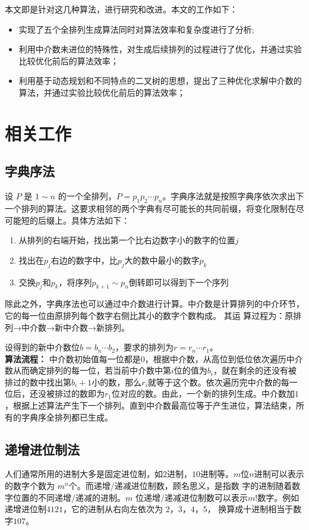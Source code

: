 \documentclass[10pt, twocolumn]{ctexart}
\begin{document}
本文即是针对这几种算法，进行研究和改进。本文的工作如下：\\
\begin{itemize}
  \item 实现了五个全排列生成算法同时对算法效率和复杂度进行了分析;
  \item 利用中介数未进位的特殊性，对生成后续排列的过程进行了优化，并通过实验比较优化前后的算法效率；
  \item 利用基于动态规划和不同特点的二叉树的思想，提出了三种优化求解中介数的算法，并通过实验比较优化前后的算法效率； 
\end{itemize}
\section{相关工作}
\subsection{字典序法}
设 $P$ 是 $1\sim n$ 的一个全排列，$P=p_1p_2\cdots p_n$。字典序法就是按照字典序依次求出下一个排列的算法。这要求相邻的两个字典有尽可能长的共同前缀，将变化限制在尽可能短的后缀上。具体方法如下：
\begin{enumerate}
  \item 从排列的右端开始，找出第一个比右边数字小的数字的位置$j$
  \item 找出在$p_j$右边的数字中，比$p_j$大的数中最小的数字$p_k$
  \item 交换$p_j$和$p_k$，将序列$p_{k+1}\sim p_{n}$倒转即可以得到下一个序列
\end{enumerate} 

除此之外，字典序法也可以通过中介数进行计算。中介数是计算排列的中介环节，它的每一位由原排列每个数字右侧比其小的数字个数构成。 其运 算过程为：原排列→中介数→新中介数→新排列。

设得到的新中介数位$b = b_n\cdots b_{2}$，要求的排列为$r= r_n\cdots r_1$。\\
\textbf{算法流程：}
中介数初始值每一位都是$0$，根据中介数，从高位到低位依次遍历中介数从而确定排列的每一位，若当前中介数中第$i$位的值为$b_i$，就在剩余的还没有被排过的数中找出第$b_i+1$小的数，那么$r_i$就等于这个数。依次遍历完中介数的每一位后，还没被排过的数即为$r_1$位对应的数。由此，一个新的排列生成。中介数加$1$，根据上述算法产生下一个排列。直到中介数最高位等于产生进位，算法结束，所有的字典序全排列都已生成。
\subsection{递增进位制法}
人们通常所用的进制大多是固定进位制，如$2$进制，$10$进制等。$m$位$n$进制可以表示的数字个数为 $m^n$个。而递增/递减进位制数，顾名思义，是指数 字的进制随着数字位置的不同递增/递减的进制。$m$ 位递增/递减进位制数可以表示$m!$数字。例如递增进位制$4121$，它的进制从右向左依次为 $2$，$3$，$4$，$5$， 换算成十进制相当于数字$107$。
\end{document}
